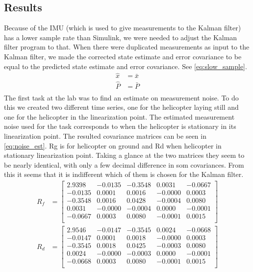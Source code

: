 \subsection{Results}
Because of the IMU (which is used to give measurements to the Kalman filter) has a lower 
sample rate than Simulink, we were needed to adjust the Kalman filter program to that. 
When there were duplicated measurements as input to the Kalman filter, we made the corrected
state estimate and error covariance to be equal to the predicted state estimate and error covariance. See \ref{eq:slow_sample}.
\begin{subequations}\label{eq:slow_sample}
    \begin{align}
    \hat{x} &= \bar{x}  \label{eq:bad_sample_x} \\
    \hat{P} &= \bar{P} \label{eq:bad_sample_p} \\
    \end{align}
\end{subequations}
The first task at the lab was to find an estimate on measurement noise. To do this we 
created two different time series, one for the helicopter laying still and one for the helicopter in the linearization point.
The estimated measurement noise used for the task corresponds to when the helicopter is stationary in its linearization point.
The resulted covariance matrices can be seen in \ref{eq:noise_est}. Rg is for helicopter on ground and Rd when helicopter in stationary linearization point.
Taking a glance at the two matrices they seem to be nearly identical, with only a few decimal difference in som covariances. 
From this it seems that it is indifferent which of them is chosen for the Kalman filter.
\begin{subequations}\label{eq:noise_est}
    \begin{align}
    R_f &=  \begin{bmatrix}
    2.9398 & -0.0135 & -0.3548 & 0.0031 & -0.0667\\
    -0.0135 &   0.0001  &  0.0016  & -0.0000  &  0.0003\\
   -0.3548  &  0.0016  &  0.0428  & -0.0004  &  0.0080\\
    0.0031  & -0.0000 &  -0.0004 &   0.0000  & -0.0001\\
   -0.0667  &  0.0003  &  0.0080 &  -0.0001  &  0.0015\\
    \end{bmatrix}\label{eq:Rg}\\
    R_d &= \begin{bmatrix}
        2.9546  & -0.0147  & -0.3545  &  0.0024   &-0.0668\\
        -0.0147 &   0.0001 &   0.0018 &  -0.0000  &  0.0003\\
        -0.3545 &   0.0018  &  0.0425 &  -0.0003  &  0.0080\\
         0.0024 &  -0.0000  & -0.0003 &   0.0000  & -0.0001\\
        -0.0668 &   0.0003  &  0.0080 &  -0.0001  &  0.0015\\
    \end{bmatrix}\label{eq:Rd}
    \end{align}
\end{subequations}



